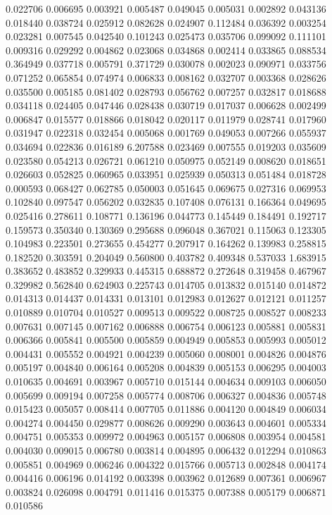 0.022706
0.006695
0.003921
0.005487
0.049045
0.005031
0.002892
0.043136
0.018440
0.038724
0.025912
0.082628
0.024907
0.112484
0.036392
0.003254
0.023281
0.007545
0.042540
0.101243
0.025473
0.035706
0.099092
0.111101
0.009316
0.029292
0.004862
0.023068
0.034868
0.002414
0.033865
0.088534
0.364949
0.037718
0.005791
0.371729
0.030078
0.002023
0.090971
0.033756
0.071252
0.065854
0.074974
0.006833
0.008162
0.032707
0.003368
0.028626
0.035500
0.005185
0.081402
0.028793
0.056762
0.007257
0.032817
0.018688
0.034118
0.024405
0.047446
0.028438
0.030719
0.017037
0.006628
0.002499
0.006847
0.015577
0.018866
0.018042
0.020117
0.011979
0.028741
0.017960
0.031947
0.022318
0.032454
0.005068
0.001769
0.049053
0.007266
0.055937
0.034694
0.022836
0.016189
6.207588
0.023469
0.007555
0.019203
0.035609
0.023580
0.054213
0.026721
0.061210
0.050975
0.052149
0.008620
0.018651
0.026603
0.052825
0.060965
0.033951
0.025939
0.050313
0.051484
0.018728
0.000593
0.068427
0.062785
0.050003
0.051645
0.069675
0.027316
0.069953
0.102840
0.097547
0.056202
0.032835
0.107408
0.076131
0.166364
0.049695
0.025416
0.278611
0.108771
0.136196
0.044773
0.145449
0.184491
0.192717
0.159573
0.350340
0.130369
0.295688
0.096048
0.367021
0.115063
0.123305
0.104983
0.223501
0.273655
0.454277
0.207917
0.164262
0.139983
0.258815
0.182520
0.303591
0.204049
0.560800
0.403782
0.409348
0.537033
1.683915
0.383652
0.483852
0.329933
0.445315
0.688872
0.272648
0.319458
0.467967
0.329982
0.562840
0.624903
0.225743
0.014705
0.013832
0.015140
0.014872
0.014313
0.014437
0.014331
0.013101
0.012983
0.012627
0.012121
0.011257
0.010889
0.010704
0.010527
0.009513
0.009522
0.008725
0.008527
0.008233
0.007631
0.007145
0.007162
0.006888
0.006754
0.006123
0.005881
0.005831
0.006366
0.005841
0.005500
0.005859
0.004949
0.005853
0.005993
0.005012
0.004431
0.005552
0.004921
0.004239
0.005060
0.008001
0.004826
0.004876
0.005197
0.004840
0.006164
0.005208
0.004839
0.005153
0.006295
0.004003
0.010635
0.004691
0.003967
0.005710
0.015144
0.004634
0.009103
0.006050
0.005699
0.009194
0.007258
0.005774
0.008706
0.006327
0.004836
0.005748
0.015423
0.005057
0.008414
0.007705
0.011886
0.004120
0.004849
0.006034
0.004274
0.004450
0.029877
0.008626
0.009290
0.003643
0.004601
0.005334
0.004751
0.005353
0.009972
0.004963
0.005157
0.006808
0.003954
0.004581
0.004030
0.009015
0.006780
0.003814
0.004895
0.006432
0.012294
0.010863
0.005851
0.004969
0.006246
0.004322
0.015766
0.005713
0.002848
0.004174
0.004416
0.006196
0.014192
0.003398
0.003962
0.012689
0.007361
0.006967
0.003824
0.026098
0.004791
0.011416
0.015375
0.007388
0.005179
0.006871
0.010586
